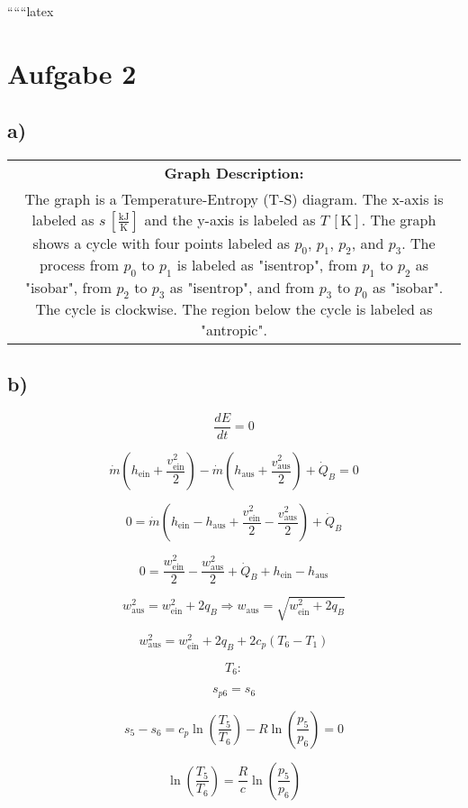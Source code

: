 
``````latex


\section*{Aufgabe 2}

\subsection*{a)}

\begin{center}
\begin{tabular}{c}
\textbf{Graph Description:} \\
The graph is a Temperature-Entropy (T-S) diagram. The x-axis is labeled as $s \, [\frac{\text{kJ}}{\text{K}}]$ and the y-axis is labeled as $T \, [\text{K}]$. The graph shows a cycle with four points labeled as $p_0$, $p_1$, $p_2$, and $p_3$. The process from $p_0$ to $p_1$ is labeled as "isentrop", from $p_1$ to $p_2$ as "isobar", from $p_2$ to $p_3$ as "isentrop", and from $p_3$ to $p_0$ as "isobar". The cycle is clockwise. The region below the cycle is labeled as "antropic".
\end{tabular}
\end{center}

\subsection*{b)}

\[
\frac{dE}{dt} = 0
\]

\[
\dot{m} (h_{\text{ein}} + \frac{v_{\text{ein}}^2}{2}) - \dot{m} (h_{\text{aus}} + \frac{v_{\text{aus}}^2}{2}) + \dot{Q}_B = 0
\]

\[
0 = \dot{m} (h_{\text{ein}} - h_{\text{aus}} + \frac{v_{\text{ein}}^2}{2} - \frac{v_{\text{aus}}^2}{2}) + \dot{Q}_B
\]

\[
0 = \frac{w_{\text{ein}}^2}{2} - \frac{w_{\text{aus}}^2}{2} + \dot{Q}_B + h_{\text{ein}} - h_{\text{aus}}
\]

\[
w_{\text{aus}}^2 = w_{\text{ein}}^2 + 2q_B \Rightarrow w_{\text{aus}} = \sqrt{w_{\text{ein}}^2 + 2q_B}
\]

\[
w_{\text{aus}}^2 = w_{\text{ein}}^2 + 2q_B + 2c_p (T_6 - T_1)
\]

\[
T_6:
\]

\[
s_{p6} = s_6
\]

\[
s_5 - s_6 = c_p \ln \left( \frac{T_5}{T_6} \right) - R \ln \left( \frac{p_5}{p_6} \right) = 0
\]

\[
\ln \left( \frac{T_5}{T_6} \right) = \frac{R}{c} \ln \left( \frac{p_5}{p_6} \right)
\]

